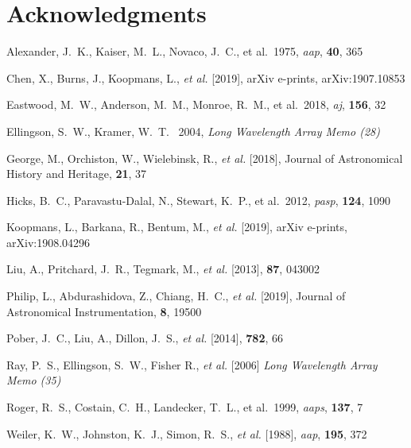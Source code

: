 \documentclass{ws-jai}
\begin{document}
	
\section*{Acknowledgments}

	
\begin{thebibliography}{9}

 Alexander, J.~K., Kaiser, M.~L., Novaco, J.~C., et al.\ 1975, {\it aap\/}, {\bf 40}, 365

 Chen, X., Burns, J., Koopmans, L., {\it et al.} [2019], arXiv e-prints, arXiv:1907.10853

 Eastwood, M.~W., Anderson, M.~M., Monroe, R.~M., et al.\ 2018, {\it aj\/}, {\bf 156}, 32

 Ellingson, S.~W., {Kramer}, W.~T. \ 2004, {\it Long Wavelength Array Memo (28)}

 George, M., Orchiston, W., Wielebinsk, R., {\it et al.} [2018], Journal of Astronomical History and Heritage, {\bf 21}, 37

 Hicks, B.~C., Paravastu-Dalal, N., Stewart, K.~P., et al.\ 2012, {\it pasp\/}, {\bf 124}, 1090

 Koopmans, L., Barkana, R., Bentum, M., {\it et al.} [2019], arXiv e-prints, arXiv:1908.04296

 Liu, A., Pritchard, J.~R., Tegmark, M., {\it et al.} [2013], {\bf 87}, 043002

 Philip, L., Abdurashidova, Z., Chiang, H.~C., {\it et al.} [2019], Journal of Astronomical Instrumentation, {\bf 8}, 19500

 Pober, J.~C., Liu, A., Dillon, J.~S., {\it et al.} [2014], {\bf 782}, 66

 Ray, P.~S., Ellingson, S.~W., Fisher R., {\it et al.} [2006] {\it Long Wavelength Array Memo (35)}

 Roger, R.~S., Costain, C.~H., Landecker, T.~L., et al.\ 1999, {\it aaps\/}, {\bf 137}, 7

 Weiler, K.~W., Johnston, K.~J., Simon, R.~S., {\it et al.} [1988], {\it aap\/}, {\bf 195}, 372






\end{thebibliography}
\end{document}
